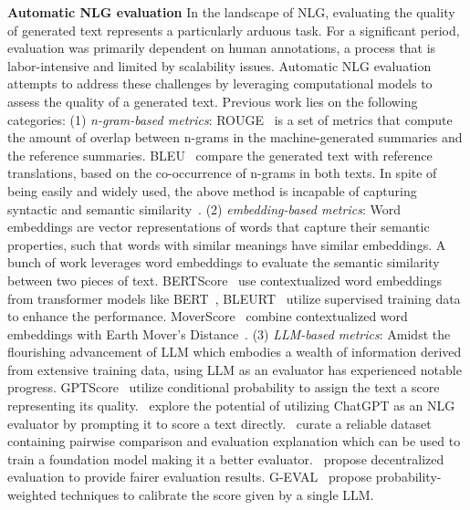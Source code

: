 \textbf{Automatic NLG evaluation}
In the landscape of NLG, evaluating the quality of generated text represents a particularly arduous task. For a significant period, evaluation was primarily dependent on human annotations, a process that is labor-intensive and limited by scalability issues. Automatic NLG evaluation attempts to address these challenges by leveraging computational models to assess the quality of a generated text. Previous work lies on the following categories: (1) \textit{n-gram-based metrics}: ROUGE~\citep{lin2004rouge} is a set of metrics that compute the amount of overlap between n-grams in the machine-generated summaries and the reference summaries. BLEU~\citep{papineni2002bleu} compare the generated text with reference translations, based on the co-occurrence of n-grams in both texts. In spite of being easily and widely used, the above method is incapable of capturing syntactic and semantic similarity~\citep{stent2005evaluating}. (2) \textit{embedding-based metrics}: Word embeddings are vector representations of words that capture their semantic properties, such that words with similar meanings have similar embeddings. A bunch of work leverages word embeddings to evaluate the semantic similarity between two pieces of text. BERTScore~\citep{zhang2019bertscore} use contextualized word embeddings from transformer models like BERT~\citep{devlin2018bert}, BLEURT~\citep{sellam2020bleurt} utilize supervised training data to enhance the performance. MoverScore~\citep{zhao2019moverscore} combine contextualized word embeddings with Earth Mover’s Distance~\citep{rubner2000earth}. (3) \textit{LLM-based metrics}: Amidst the flourishing advancement of LLM which embodies a wealth of information derived from extensive training data, using LLM as an evaluator has experienced notable progress. GPTScore~\citep{fu2023gptscore} utilize conditional probability to assign the text a score representing its quality.~\cite{wang2023chatgpt} explore the potential of utilizing ChatGPT as an NLG evaluator by prompting it to score a text directly.~\cite{wang2023pandalm} curate a reliable dataset containing pairwise comparison and evaluation explanation which can be used to train a foundation model making it a better evaluator.~\cite{bai2023benchmarking} propose decentralized 
evaluation to provide fairer evaluation results. G-EVAL~\citep{liu2023gpteval} propose probability-weighted techniques to calibrate the score given by a single LLM. 

